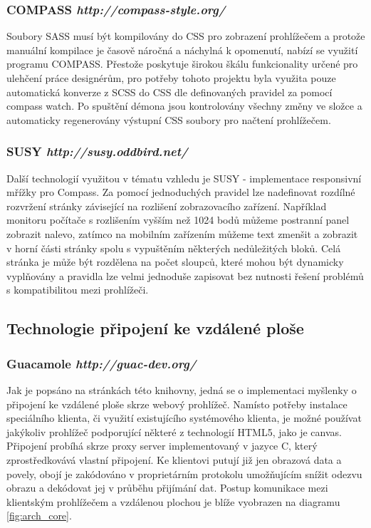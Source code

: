 \subsubsection*{COMPASS \hfill \emph{http://compass-style.org/}}
Soubory SASS musí být kompilovány do CSS pro zobrazení prohlížečem a protože manuální kompilace je časově náročná a náchylná k opomenutí, nabízí se využití programu COMPASS. Přestože poskytuje širokou škálu funkcionality určené pro ulehčení práce designérům, pro potřeby tohoto projektu byla využita pouze automatická konverze z SCSS do CSS dle definovaných pravidel za pomocí compass watch. Po spuštění démona jsou kontrolovány všechny změny ve složce a automaticky regenerovány výstupní CSS soubory pro načtení prohlížečem.

\subsubsection*{SUSY \hfill \emph{http://susy.oddbird.net/}}
Další technologií využitou v tématu vzhledu je SUSY - implementace responsivní mřížky pro Compass. Za pomocí jednoduchých pravidel lze nadefinovat rozdílné rozvržení stránky závisející na rozlišení zobrazovacího zařízení. Například monitoru počítače s rozlišením vyšším než 1024 bodů můžeme postranní panel zobrazit nalevo, zatímco na mobilním zařízením můžeme text zmenšit a zobrazit v horní části stránky spolu s vypuštěním některých nedůležitých bloků. Celá stránka je může být rozdělena na počet sloupců, které mohou být dynamicky vyplňovány a pravidla lze velmi jednoduše zapisovat bez nutnosti řešení problémů s kompatibilitou mezi prohlížeči.

\subsection{Technologie připojení ke vzdálené ploše}

\subsubsection*{Guacamole \hfill \emph{http://guac-dev.org/}}
Jak je popsáno na stránkách této knihovny, jedná se o implementaci myšlenky o připojení ke vzdálené ploše skrze webový prohlížeč. Namísto potřeby instalace speciálního klienta, či využití existujícího systémového klienta, je možné používat jakýkoliv prohlížeč podporující některé z technologií HTML5, jako je canvas. Připojení probíhá skrze proxy server implementovaný v jazyce C, který zprostředkovává vlastní připojení. Ke klientovi putují již jen obrazová data a povely, obojí je zakódováno v proprietárním protokolu umožňujícím snížit odezvu obrazu a dekódovat jej v průběhu přijímání dat. Postup komunikace mezi klientským prohlížečem a vzdálenou plochou je blíže vyobrazen na diagramu \ref{fig:arch_core}.

